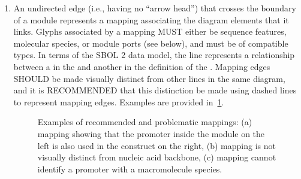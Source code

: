 \begin{enumerate}
\item An undirected edge (i.e., having no ``arrow head'') that crosses the boundary of a module represents a mapping associating the diagram elements that it links. 
Glyphs associated by a mapping MUST either be sequence features, molecular species, or module ports (see below), and must be of compatible types.
In terms of the SBOL 2 data model, the line represents a  relationship between a  in the  and another  in the definition of the .
	Mapping edges SHOULD be made visually distinct from other lines in the same diagram, and it is RECOMMENDED that this distinction be made using dashed lines to represent mapping edges.
	Examples are provided in~\ref{exa:moduleB}.

	\begin{figure}[h!]
	\centering
	\caption{Examples of recommended and problematic mappings: (a) mapping showing that the promoter inside the module on the left is also used in the construct on the right, (b) mapping is not visually distinct from nucleic acid backbone, (c) mapping cannot identify a promoter with a macromolecule species.}
	\label{exa:moduleB}
	\end{figure}


\end{enumerate}

